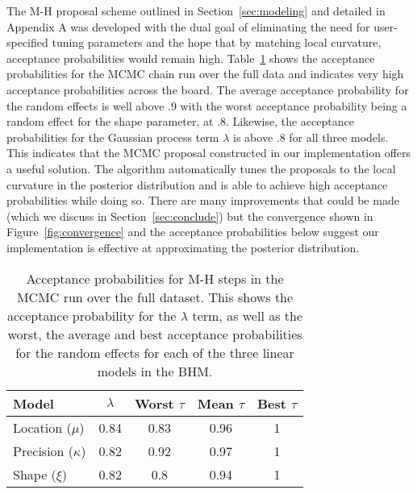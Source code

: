 \documentclass[11pt,english]{article}
\begin{document}
The M-H proposal scheme outlined in Section~\ref{sec:modeling} and detailed in Appendix A was developed with the dual goal of eliminating the need for user-specified tuning parameters and the hope that by matching local curvature, acceptance probabilities would remain high.  Table~\ref{tab:acceptance} shows the acceptance probabilities for the MCMC chain run over the full data and indicates very high acceptance probabilities across the board.  The average acceptance probability for the random effects is well above .9 with the worst acceptance probability being a random effect for the shape parameter, at $.8$.  Likewise, the acceptance probabilities for the Gaussian process term $\lambda$ is above .8 for all three models.  This indicates that the MCMC proposal constructed in our implementation offers a useful solution.  The algorithm automatically tunes the proposals to the local curvature in the posterior distribution and is able to achieve high acceptance probabilities while doing so.  There are many improvements that could be made (which we discuss in Section~\ref{sec:conclude}) but the convergence shown in Figure~\ref{fig:convergence} and the acceptance probabilities below suggest our implementation is effective at approximating the posterior distribution.
\begin{table}
\caption{Acceptance probabilities for M-H steps in the MCMC run over the full dataset.  This shows the acceptance probability for the $\lambda$ term, as well as the worst, the average and best acceptance probabilities for the random effects for each of the three linear models in the BHM.}\label{tab:acceptance}
\begin{center}
\begin{tabular}{l c c c c}
\hline\hline
Model & $\lambda$ & Worst $\tau$ & Mean $\tau$ & Best $\tau$\\
\hline
Location ($\mu$) & 0.84 & 0.83 & 0.96 & 1\\
Precision ($\kappa$) & 0.82 & 0.92 & 0.97 & 1\\
Shape ($\xi$) & 0.82 & 0.8 & 0.94 & 1\\
\hline\hline
\end{tabular}
\end{center}
\end{table}
\end{document}
